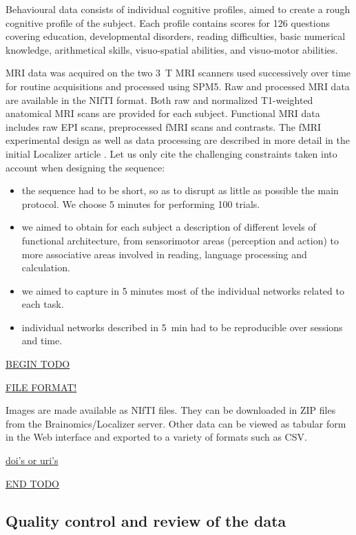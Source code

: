 \documentclass[review]{elsarticle}
\begin{document}
Behavioural data consists of individual cognitive profiles, aimed to create
a rough cognitive profile of the subject. Each profile contains scores for 126
questions covering education, developmental disorders, reading difficulties,
basic numerical knowledge, arithmetical skills, visuo-spatial abilities, and
visuo-motor abilities.

MRI data was acquired on the two 3~T MRI scanners used successively over
time for routine acquisitions and processed using SPM5. Raw and processed
MRI data are available in the NIfTI format. Both raw and normalized T1-weighted
anatomical MRI scans are provided for each subject. Functional MRI data includes
raw EPI scans, preprocessed fMRI scans and contrasts. The fMRI experimental design
as well as data processing are described in more detail in the initial Localizer
article \cite{Pinel2007}. Let us only cite the challenging constraints taken
into account when designing the sequence:
\begin{itemize}
\item the sequence had to be short, so as to disrupt as little as possible the main protocol. We choose 5 minutes for performing 100 trials.
\item we aimed to obtain for each subject a description of different levels of functional architecture, from sensorimotor areas (perception and action) to more associative areas involved in reading, language processing and calculation.
\item we aimed to capture in 5 minutes most of the individual networks related to each task.
\item individual networks described in 5~min had to be reproducible over sessions and time.
\end{itemize}

\underline{BEGIN TODO}

\underline{FILE FORMAT!}

Images are made available as NIfTI files. They can be downloaded in ZIP files from
the Brainomics/Localizer server. Other data can be viewed as tabular form in the Web
interface and exported to a variety of formats such as CSV.

\underline{doi's or uri's}

\underline{END TODO}


\subsection{Quality control and review of the data}
\end{document}
